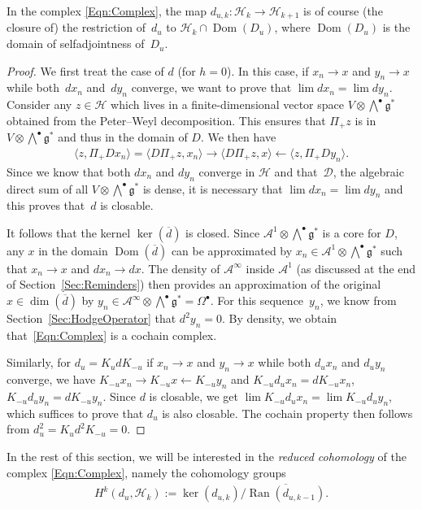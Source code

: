 \documentclass[pdftex]{sigma}
\newcommand{\Aa}{\mathcal{A}}
\newcommand{\Complex}[1][]{(d_{#1}, \Hh_k)}
\newcommand{\Dd}{\mathscr{D}}
\newcommand{\Hh}{\mathscr{H}}
\newcommand{\LieG}{\mathfrak{g}}
\DeclareMathOperator{\dom}{Dom}
\DeclareMathOperator{\Ran}{Ran}
\numberwithin{equation}{section}
\begin{document}
\begin{Remark}
In the complex \eqref{Eqn:Complex}, the map $d_{u,k} \colon \Hh_{k} \to \Hh_{k+1}$ is of course (the closure of) the restriction of~$d_u$ to $\Hh_k \cap \dom(D_u)$, where $\dom(D_u)$ is the domain of selfadjointness of~$D_u$.
\end{Remark}

\begin{proof}
We f\/irst treat the case of $d$ (for $h = 0$). In this case, if $x_n \to x$ and $y_n \to x$ while both~$d x_n$ and~$d y_n$ converge, we want to prove that $\lim d x_n = \lim d y_n$. Consider any $z \in \Hh$ which lives in a f\/inite-dimensional vector space $V \otimes \bigwedge^\bullet \LieG^*$ obtained from the Peter--Weyl decomposition. This ensures that $\Pi_+ z$ is in $V \otimes \bigwedge^\bullet \LieG^*$ and thus in the domain of $D$. We then have
\begin{gather*}
\langle z, \Pi_+ D x_n \rangle = \langle D \Pi_+ z, x_n \rangle \to \langle D \Pi_+ z, x \rangle \leftarrow \langle z, \Pi_+ D y_n \rangle.
\end{gather*}
Since we know that both $d x_n$ and $d y_n$ converge in $\Hh$ and that~$\Dd$, the algebraic direct sum of all $V \otimes \bigwedge^\bullet \LieG^*$ is dense, it is necessary that $\lim d x_n = \lim d y_n$ and this proves that~$d$ is closable.

It follows that the kernel $\ker( \overline{d})$ is closed. Since $\Aa^1 \otimes \bigwedge^\bullet \LieG^*$ is a core for $D$, any $x$ in the domain $\dom( \overline{d} )$ can be approximated by $x_n \in \Aa^1 \otimes \bigwedge^\bullet \LieG^*$ such that $x_n \to x$ and $d x_n \to d x$. The density of $\Aa^\infty $ inside $\Aa^1$ (as discussed at the end of Section~\ref{Sec:Reminders}) then provides an approximation of the original $x \in \dim( \overline{d} )$ by $y_n \in \Aa^\infty \otimes \bigwedge^\bullet \LieG^* = \Omega^\bullet$. For this sequence~$y_n$, we know from Section~\ref{Sec:HodgeOperator} that $d^2 y_n = 0$. By density, we obtain that~\eqref{Eqn:Complex} is a cochain complex.

Similarly, for $d_u = K_u d K_{-u}$ if $x_n \to x$ and $y_n \to x$ while both $d_u x_n$ and $d_u y_n$ converge, we have $K_{-u} x_n \to K_{-u} x \leftarrow K_{-u} y_n$ and $K_{-u} d_u x_n = d K_{-u} x_n$, $K_{-u} d_u y_n = d K_{-u} y_n$. Since $d$ is closable, we get $\lim K_{-u} d_u x_n = \lim K_{-u} d_u y_n$, which suf\/f\/ices to prove that $d_u$ is also closable. The cochain property then follows from $d_u^2 = K_u d^2 K_{-u} = 0$.
\end{proof}
In the rest of this section, we will be interested in the \emph{reduced cohomology} of the complex \eqref{Eqn:Complex}, namely the cohomology groups
\begin{gather}
\label{Eqn:RedCohom}
H^k\Complex[u] := \ker(d_{u,k})/ \overline{\Ran(d_{u,k-1})}.
\end{gather}
\end{document}
